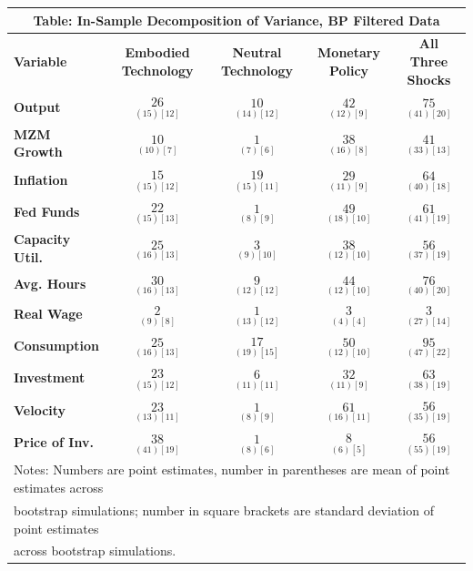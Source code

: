 \documentclass{article}
\begin{document}
 \begin{tabular}{|l|c|@{}c|c|@{}c|} 
 \hline 
 \multicolumn{5}{|c|}{\textbf{Table: In-Sample Decomposition of Variance, BP Filtered Data}} \\ \hline 
 \textbf{Variable} & \textbf{Embodied Technology} & \textbf{Neutral Technology} & \textbf{%
 Monetary Policy} & \textbf{All Three Shocks} \\ \hline\hline 
 \textbf{Output} & $\underset{( 15)[ 12]}{ 26}$ & $\underset{( 14)[ 12]}{ 10}$ & $\underset{( 12)[  9]}{ 42}$ & $\underset{( 41)[ 20]}{ 75}$ \\ \hline 
 \textbf{MZM Growth} & $\underset{( 10)[  7]}{ 10}$ & $\underset{(  7)[  6]}{  1}$ & $\underset{( 16)[  8]}{ 38}$ & $\underset{( 33)[ 13]}{ 41}$ \\ \hline 
 \textbf{Inflation} & $\underset{( 15)[ 12]}{ 15}$ & $\underset{( 15)[ 11]}{ 19}$ & $\underset{( 11)[  9]}{ 29}$ & $\underset{( 40)[ 18]}{ 64}$ \\ \hline 
 \textbf{Fed Funds} & $\underset{( 15)[ 13]}{ 22}$ & $\underset{(  8)[  9]}{  1}$ & $\underset{( 18)[ 10]}{ 49}$ & $\underset{( 41)[ 19]}{ 61}$ \\ \hline 
 \textbf{Capacity Util.} & $\underset{( 16)[ 13]}{ 25}$ & $\underset{(  9)[ 10]}{  3}$ & $\underset{( 12)[ 10]}{ 38}$ & $\underset{( 37)[ 19]}{ 56}$ \\ \hline 
 \textbf{Avg. Hours} & $\underset{( 16)[ 13]}{ 30}$ & $\underset{( 12)[ 12]}{  9}$ & $\underset{( 12)[ 10]}{ 44}$ & $\underset{( 40)[ 20]}{ 76}$ \\ \hline 
 \textbf{Real Wage} & $\underset{(  9)[  8]}{  2}$ & $\underset{( 13)[ 12]}{  1}$ & $\underset{(  4)[  4]}{  3}$ & $\underset{( 27)[ 14]}{  3}$ \\ \hline 
 \textbf{Consumption} & $\underset{( 16)[ 13]}{ 25}$ & $\underset{( 19)[ 15]}{ 17}$ & $\underset{( 12)[ 10]}{ 50}$ & $\underset{( 47)[ 22]}{ 95}$ \\ \hline 
 \textbf{Investment} & $\underset{( 15)[ 12]}{ 23}$ & $\underset{( 11)[ 11]}{  6}$ & $\underset{( 11)[  9]}{ 32}$ & $\underset{( 38)[ 19]}{ 63}$ \\ \hline 
 \textbf{Velocity} & $\underset{( 13)[ 11]}{ 23}$ & $\underset{(  8)[  9]}{  1}$ & $\underset{( 16)[ 11]}{ 61}$ & $\underset{( 35)[ 19]}{ 56}$ \\ \hline 
 \textbf{Price of Inv.} & $\underset{( 41)[ 19]}{ 38}$ & $\underset{(  8)[  6]}{  1}  $ & $\underset{(  6)[  5]}{  8}$ & $\underset{( 55)[ 19]}{ 56}$ \\ \hline 
 \multicolumn{5}{|l|}{Notes: Numbers are point estimates, number in 
 parentheses are mean of point estimates across} \\ \hline 
 \multicolumn{5}{|l|}{bootstrap simulations; number in square brackets are 
 standard deviation of point estimates} \\ \hline 
 \multicolumn{5}{|l|}{across bootstrap simulations.} \\ \hline 
 \end{tabular} 
\end{document}
